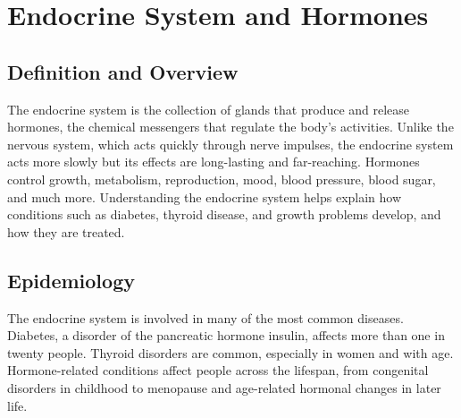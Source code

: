 \chapter{Endocrine System and Hormones}

\section*{Definition and Overview}
The endocrine system is the collection of glands that produce and release hormones, the chemical messengers that regulate the body's activities. Unlike the nervous system, which acts quickly through nerve impulses, the endocrine system acts more slowly but its effects are long-lasting and far-reaching. Hormones control growth, metabolism, reproduction, mood, blood pressure, blood sugar, and much more. Understanding the endocrine system helps explain how conditions such as diabetes, thyroid disease, and growth problems develop, and how they are treated.

\section*{Epidemiology}
The endocrine system is involved in many of the most common diseases. Diabetes, a disorder of the pancreatic hormone insulin, affects more than one in twenty people. Thyroid disorders are common, especially in women and with age. Hormone-related conditions affect people across the lifespan, from congenital disorders in childhood to menopause and age-related hormonal changes in later life.

